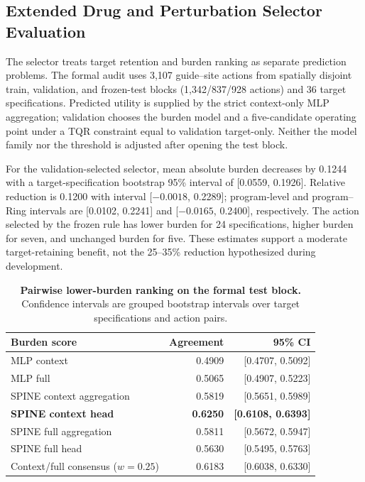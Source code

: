 \documentclass[sigconf,review,balance=false]{acmart}
\begin{document}
\subsection{Extended Drug and Perturbation Selector Evaluation}
\label{app:selector_audit}

The selector treats target retention and burden ranking as separate prediction
problems. The formal audit uses 3,107 guide--site actions from spatially
disjoint train, validation, and frozen-test blocks (1,342/837/928 actions) and
36 target specifications. Predicted utility is supplied by the strict
context-only MLP aggregation; validation chooses the burden model and a
five-candidate operating point under a TQR constraint equal to validation
target-only. Neither the model family nor the threshold is adjusted after
opening the test block.

For the validation-selected selector, mean absolute burden decreases by 0.1244
with a target-specification bootstrap 95\% interval of [0.0559, 0.1926].
Relative reduction is 0.1200 with interval [$-0.0018$, 0.2289]; program-level
and program--Ring intervals are [0.0102, 0.2241] and
[$-0.0165$, 0.2400], respectively. The action selected by the frozen rule has
lower burden for 24 specifications, higher burden for seven, and unchanged
burden for five. These estimates support a moderate target-retaining benefit,
not the 25--35\% reduction hypothesized during development.

\begin{table}[t]
\centering
\scriptsize
\caption{\textbf{Pairwise lower-burden ranking on the formal test block.}
Confidence intervals are grouped bootstrap intervals over target
specifications and action pairs.}
\label{tab:app_selector_pairwise}
\setlength{\tabcolsep}{4pt}
\begin{tabular}{@{}lrr@{}}
\toprule
Burden score & Agreement & 95\% CI \\
\midrule
MLP context & 0.4909 & [0.4707, 0.5092] \\
MLP full & 0.5065 & [0.4907, 0.5223] \\
SPINE context aggregation & 0.5819 & [0.5651, 0.5989] \\
\textbf{SPINE context head} & \textbf{0.6250} & \textbf{[0.6108, 0.6393]} \\
SPINE full aggregation & 0.5811 & [0.5672, 0.5947] \\
SPINE full head & 0.5630 & [0.5495, 0.5763] \\
Context/full consensus ($w=0.25$) & 0.6183 & [0.6038, 0.6330] \\
\bottomrule
\end{tabular}
\end{table}
\end{document}
